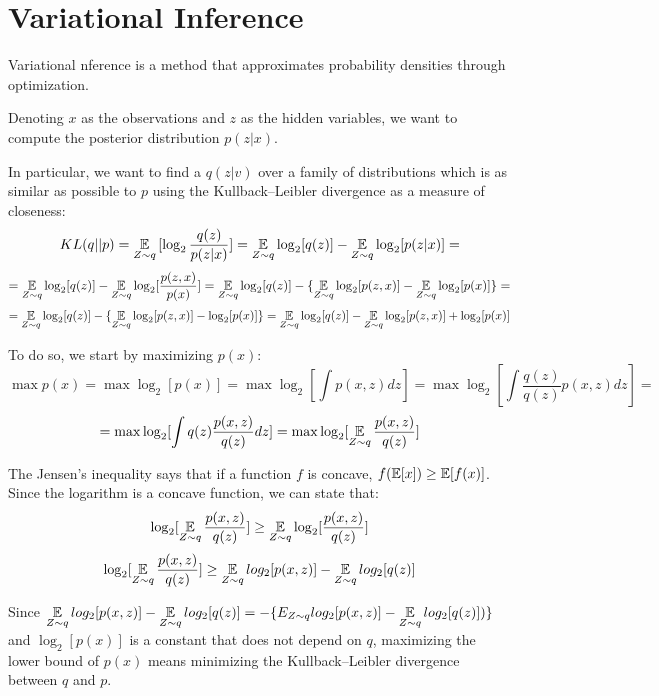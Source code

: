 \chapter{Variational Inference} \label{vi}
Variational nference is a method that approximates probability densities through optimization.

Denoting $x$ as the observations and $z$ as the hidden variables,
we want to compute the posterior distribution $p(z | x)$.

In particular, we want to find a $q(z | v)$ over a family of distributions which is as similar
as possible to $p$ using the Kullback–Leibler divergence as a measure of closeness:
$$ KL(q || p) = \operatorname*{\mathbb{E}}_{Z \sim q} {[\log_2 \frac{q(z)}{p(z | x)}]} = \operatorname*{\mathbb{E}}_{Z \sim q} \log_2 [q(z)] - \operatorname*{\mathbb{E}}_{Z \sim q} \log_2 [p(z | x)] = $$
$$ = \operatorname*{\mathbb{E}}_{Z \sim q} \log_2 [q(z)] - \operatorname*{\mathbb{E}}_{Z \sim q} \log_2 [\frac{p(z,x)}{p(x)}] = \operatorname*{\mathbb{E}}_{Z \sim q} \log_2 [q(z)] - \{ \operatorname*{\mathbb{E}}_{Z \sim q} \log_2 [p(z,x)] - \operatorname*{\mathbb{E}}_{Z \sim q} \log_2 [p(x)] \} = $$
$$ = \operatorname*{\mathbb{E}}_{Z \sim q} \log_2 [q(z)] - \{ \operatorname*{\mathbb{E}}_{Z \sim q} \log_2 [p(z,x)] - \log_2 [p(x)] \} = \operatorname*{\mathbb{E}}_{Z \sim q} \log_2 [q(z)] - \operatorname*{\mathbb{E}}_{Z \sim q} \log_2 [p(z,x)] + \log_2 [p(x)] $$


To do so, we start by maximizing $p(x)$:
$$
    \displaystyle \max p(x) = \max \log_2[p(x)]
    = \max \log_2[\int p(x,z) dz]
    = \max \log_2[\int \frac{q(z)}{q(z)} p(x,z) dz] =
$$
$$
    = \max \log_2[\int q(z) \frac{p(x,z)}{q(z)} dz]
    = \max \log_2[\operatorname*{\mathbb{E}}_{Z \sim q} \frac{p(x,z)}{q(z)}]
$$

The Jensen's inequality says that if a function $f$ is concave, $f(\operatorname*{\mathbb{E}}[x]) \geq \operatorname*{\mathbb{E}}[f(x)]$.
Since the logarithm is a concave function, we can state that:
$$ \log_2[\operatorname*{\mathbb{E}}_{Z \sim q} \frac{p(x,z)}{q(z)}] \geq \operatorname*{\mathbb{E}}_{Z \sim q} \log_2[\frac{p(x,z)}{q(z)}] $$
$$ \log_2[\operatorname*{\mathbb{E}}_{Z \sim q} \frac{p(x,z)}{q(z)}] \geq \operatorname*{\mathbb{E}}_{Z \sim q} log_2[p(x,z)] - \operatorname*{\mathbb{E}}_{Z \sim q} log_2[q(z)] $$

Since $ \displaystyle \operatorname*{\mathbb{E}}_{Z \sim q} log_2[p(x,z)] - \operatorname*{\mathbb{E}}_{Z \sim q} log_2[q(z)] = -\{E_{Z \sim q} log_2[p(x,z)] - \operatorname*{\mathbb{E}}_{Z \sim q} log_2[q(z)])\}$
and $\log_2[p(x)]$ is a constant that does not depend on $q$,
maximizing the lower bound of $p(x)$ means minimizing the Kullback–Leibler divergence between $q$ and $p$.

